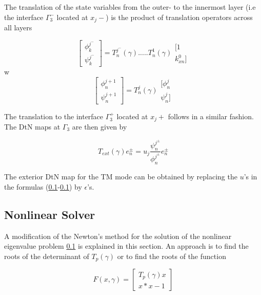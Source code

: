 The translation of the state variables from the outer- to the
innermost layer (i.e the interface $\Gamma_3^-$ located at $x_j-$) is
the product of translation operators across all layers

\begin{equation}
\left[ \begin{array}{ll} \phi_k^{j^-} \\ \psi_k^{j^-}
\end{array} \right] = T_n^{j^-}(\gamma) ..... T_n^1(\gamma)
\begin{array}{ll} [1 \\ k_{xn}^0] \end{array}
\end{equation}
w\begin{equation}
\left[ \begin{array}{ll} \phi_n^{j+1} \\ \psi_n^{j+1}
\end{array} \right] = T_n^j(\gamma)
\begin{array}{ll} [\phi_n^{j} \\ \psi_n^{j}] \end{array}
\end{equation}

The translation to the interface $\Gamma_3^+$ located at $x_j+$
follows in a similar fashion. The DtN maps at $\Gamma_3$ are then
given by 

\begin{equation}
T_{ext}(\gamma) e_n^\pm = u_j \frac{\psi_n^{j^\pm}}{\phi_n^{j^\pm}} e_n^\pm
\end{equation}

The exterior DtN map for the TM mode can be obtained by replacing the
$u$'s in the formulas (\ref{}-\ref{}) by $\epsilon$'s.

\subsection{Nonlinear Solver}
A modification of the Newton's method for the solution of the
nonlinear eigenvalue problem \ref{} is explained in this section. An
approach is to find the roots of the determinant of $T_p(\gamma)$ or
to find the roots of the function

\begin{equation}
F(x,\gamma) = \left[ \begin{array}{cc} T_p(\gamma)x \\
x*x-1 \end{array} \right]
\end{equation}


